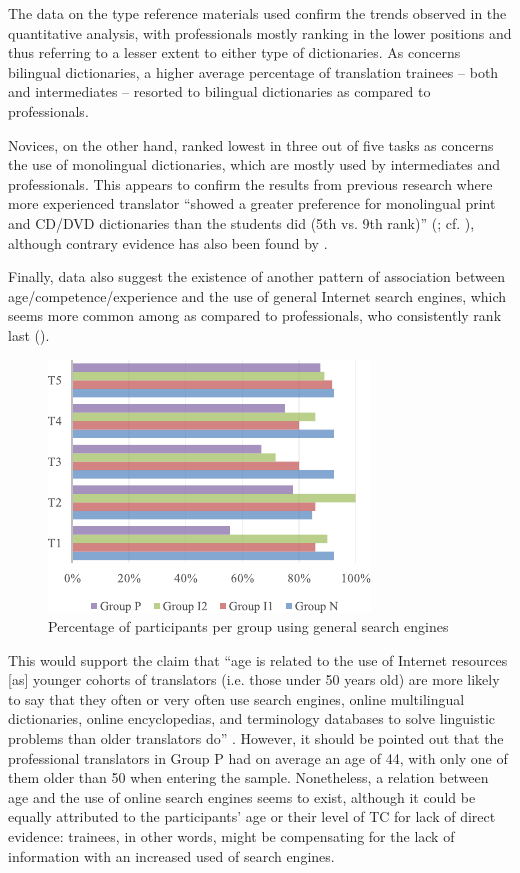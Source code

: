 \documentclass[output=paper]{LSP/langsci}
\begin{document}
The data on the type reference materials used confirm the trends observed in the quantitative analysis, with professionals mostly ranking in the lower positions and thus referring to a lesser extent to either type of dictionaries. As concerns bilingual dictionaries, a higher average percentage of translation trainees -- both  and intermediates -- resorted to bilingual dictionaries as compared to professionals.

\largerpage
Novices, on the other hand, ranked lowest in three out of five tasks as concerns the use of monolingual dictionaries, which are mostly used by intermediates and professionals. This appears to confirm the results from previous research where more experienced translator ``showed a greater preference for monolingual print and CD/DVD dictionaries than the students did (5th vs. 9th rank)'' (\citealt[197--198]{Massey2011}; cf. \citealt[590]{Ronowicz2005}), although contrary evidence has also been found by \citet[513--514]{Kunzli2001}.

Finally, data also suggest the existence of another pattern of association between age/competence/experience and the use of general Internet search engines, which seems more common among  as compared to professionals, who consistently rank last ().

\begin{figure}
 \includegraphics[width=.4\textwidth]{figures/quinci/figure4.pdf}
 \caption{Percentage of participants per group using general search engines}
 \label{quinci:fig:4}
\end{figure}

This would support the claim that ``age is related to the use of Internet resources [as] younger cohorts of translators (i.e. those under 50 years old) are more likely to say that they often or very often use search engines, online multilingual dictionaries, online encyclopedias, and terminology databases to solve linguistic problems than older translators do'' \citep[201]{Massey2011}. However, it should be pointed out that the professional translators in Group P had on average an age of 44, with only one of them older than 50 when entering the sample. Nonetheless, a relation between age and the use of online search engines seems to exist, although it could be equally attributed to the participants' age or their level of TC for lack of direct evidence: trainees, in other words, might be compensating for the lack of information with an increased used of search engines.
\end{document}

